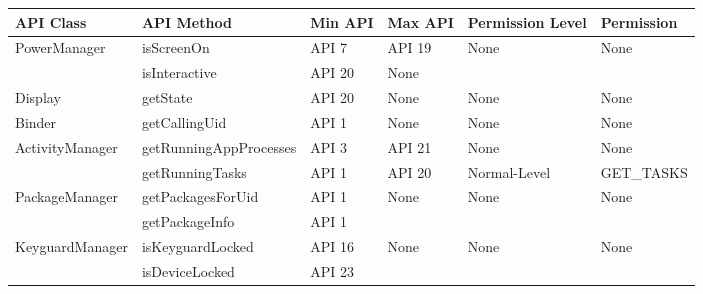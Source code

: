 \begin{table}[H]
\scriptsize
\centering
\begin{tabular}{|l|l|l|l|l|l|}
\hline
\textbf{API Class}                          & \textbf{API Method}                  & \textbf{Min API}      & \textbf{Max API}       & \textbf{Permission Level}               & \textbf{Permission}                             \\ \hline
\multirow{2}{*}{PowerManager}      & isScreenOn                  & API 7       & API 19       & \multirow{2}{*}{None}          & \multirow{2}{*}{None}                  \\ \cline{2-4}
                                   & isInteractive               & API 20      & None                  &                                &                                        \\ \hline
Display                            & getState                    & API 20      & None                  & None                           & None                                   \\ \hline
Binder                             & getCallingUid               & API 1      & None                  & None                           & None                                   \\ \hline
\multirow{2}{*}{ActivityManager}   & getRunningAppProcesses      & API 3      & API 21     & None                           & None                                   \\ \cline{2-6}
                                   & getRunningTasks             & API 1      & API 20       & Normal-Level                   & GET\_TASKS                             \\ \hline
\multirow{2}{*}{PackageManager}    & getPackagesForUid           & API 1      & \multirow{2}{*}{None} & \multirow{2}{*}{None}          & \multirow{2}{*}{None}                  \\ \cline{2-3}
                                   & getPackageInfo              & API 1      &                       &                                &                                        \\ \hline
\multirow{2}{*}{KeyguardManager}   & isKeyguardLocked            & API 16  & \multirow{2}{*}{None} & \multirow{2}{*}{None}          & \multirow{2}{*}{None}                  \\ \cline{2-3}
                                   & isDeviceLocked              & API 23 &                       &                                &                                        \\ \hline

\end{tabular}
\end{table}
